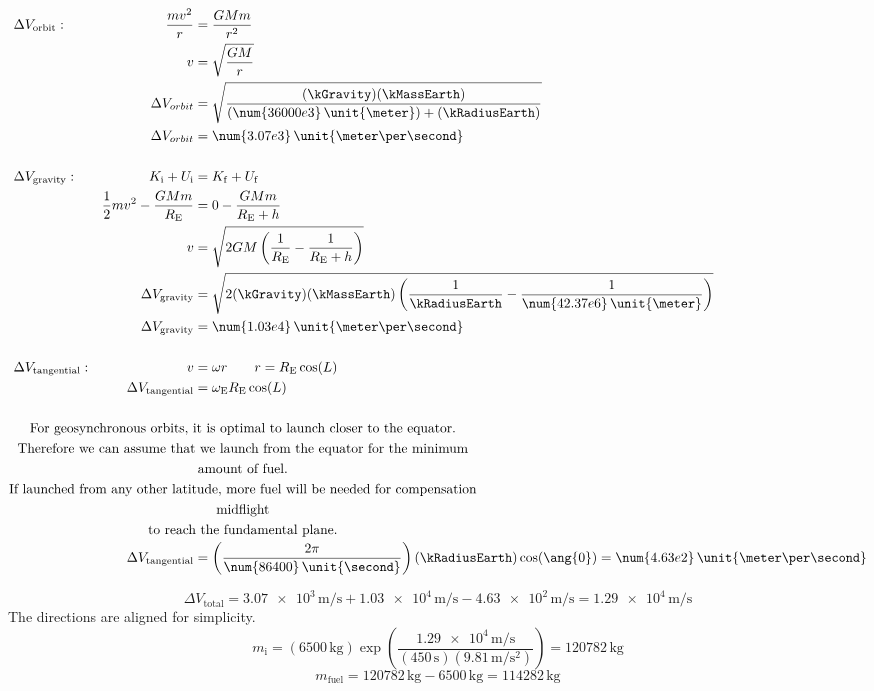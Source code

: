 \documentclass{article}
\begin{document}
{\begin{enumerate}
		\begin{equation*}
			\begin{aligned}
				&\Delta V_{\mathrm{orbit}} : & \frac{mv^2}{r} &= \frac{GMm}{r^2} \\
				~ & ~ & v &= \sqrt{\frac{GM}{r}} \\
				~ & ~ & \Delta V_{orbit} &= \sqrt{\frac{(\kGravity)(\kMassEarth)}{(\num{36000e3} \, \unit{\meter}) + (\kRadiusEarth)}} \\
				~ & ~ & \Delta V_{orbit} &= \num{3.07e3} \, \unit{\meter\per\second} \\
				~ \\
				&\Delta V_{\mathrm{gravity}} : & K_\mathrm{i} + U_\mathrm{i} &= K_\mathrm{f} + U_\mathrm{f} \\
				~ & ~ & \frac{1}{2} m v^2 - \frac{GMm}{R_\mathrm{E}} &= 0 - \frac{GMm}{R_\mathrm{E} + h} \\
				~ & ~ & v &= \sqrt{ 2GM \left( \frac{1}{R_\mathrm{E}} - \frac{1}{R_\mathrm{E} + h} \right) } \\
				~ & ~ & \Delta V_{\mathrm{gravity}} &= \sqrt{ 2(\kGravity)(\kMassEarth) \left( \frac{1}{\kRadiusEarth} - \frac{1}{\num{42.37e6} \, \unit{\meter}} \right) } \\
				~ & ~ & \Delta V_{\mathrm{gravity}} &= \num{1.03e4} \, \unit{\meter\per\second} \\
				~ \\
				&\Delta V_{\mathrm{tangential}} : & v &= \omega r \qquad r = R_\mathrm{E} \cos (L) \\
				~ & ~ & \Delta V_{\mathrm{tangential}} &= \omega_\mathrm{E} R_\mathrm{E} \cos (L) \\
				~ \\
				\noalign{\centering For geosynchronous orbits, it is optimal to launch closer to the equator. \\
					Therefore we can assume that we launch from the equator for the minimum amount of fuel. \\
					If launched from any other latitude, more fuel will be needed for compensation midflight \\
					to reach the fundamental plane.}
				~ & ~ & \Delta V_{\mathrm{tangential}} &= \left( \frac{2\pi}{\num{86400} \, \unit{\second}} \right) (\kRadiusEarth) \cos (\ang{0}) = \num{4.63e2} \, \unit{\meter\per\second} \\
			\end{aligned}
		\end{equation*}
	
		\[
			\Delta V_{\mathrm{total}} = \num{3.07e3} \, \unit{\meter\per\second} + \num{1.03e4} \, \unit{\meter\per\second} - \num{4.63e2} \, \unit{\meter\per\second} = \num{1.29e4} \, \unit{\meter\per\second}
		\]
		\centering The directions are aligned for simplicity.		
		\[
			m_\mathrm{i} = (\num{6500} \, \unit{\kilogram}) \exp\left( \frac{\num{1.29e4} \, \unit{\meter\per\second}}{(\num{450} \, \unit{\second})(\num{9.81} \, \unit{\meter\per\second\squared})} \right) = \num{120782} \, \unit{\kilogram}
		\]
		\[
			m_\mathrm{fuel} = \num{120782} \, \unit{\kilogram} - \num{6500} \, \unit{\kilogram} = \num{114282} \, \unit{\kilogram}
		\]
		

\end{enumerate}}
\end{document}
